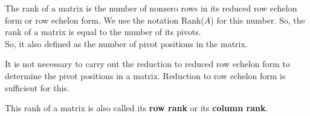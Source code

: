 \documentclass[aima104_lecturenotes_ku.tex]{subfiles}
\begin{document}
\begin{mdframed}
\begin{definition}
The rank of a matrix is the number of nonzero rows in its reduced row echelon form or row echelon form. We use the notation Rank($A$) for this number. So, the rank of a matrix is equal to the number of its pivots. \\[3mm]

So, it also defined as the number of pivot positions in the matrix.
\end{definition}
\end{mdframed}

\begin{remark}
  It is not necessary to carry out the reduction to reduced row echelon form to determine the pivot positions in a matrix. Reduction to row echelon form is sufficient for this.
\end{remark}

\begin{remark}
  This rank of a matrix is also called its \textbf{row rank} or its \textbf{column rank}.
\end{remark}
\end{document}
